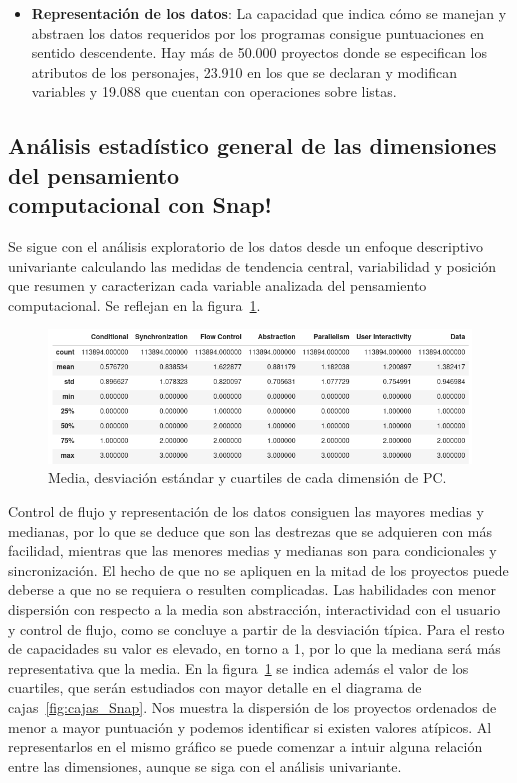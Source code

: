 \documentclass[a4paper, 12pt]{book}
\begin{document}
\begin{itemize}
    \item \textbf{Representación de los datos}: La capacidad que indica cómo se manejan y abstraen los datos requeridos por los programas consigue puntuaciones en sentido descendente. Hay más de 50.000 proyectos donde se especifican los atributos de los personajes, 23.910 en los que se declaran y modifican variables y 19.088 que cuentan con operaciones sobre listas. 
\end{itemize}    

\subsection{Análisis estadístico general de las dimensiones del pensamiento \\computacional con Snap!}
\label{subsec:estad_pc_Snap}

Se sigue con el análisis exploratorio de los datos desde un enfoque descriptivo univariante calculando las medidas de tendencia central, variabilidad y posición que resumen y caracterizan cada variable analizada del pensamiento computacional. Se reflejan en la figura~\ref{fig:describe_Snap}.

\begin{figure}[H]
    \centering
    \includegraphics[width=1\textwidth]{img/describe_Snap.png}
    \caption{Media, desviación estándar y cuartiles de cada dimensión de PC.}
    \label{fig:describe_Snap}
\end{figure}

Control de flujo y representación de los datos consiguen las mayores medias y medianas, por lo que se deduce que son las destrezas que se adquieren con más facilidad, mientras que las menores medias y medianas son para condicionales y sincronización. El hecho de que no se apliquen en la mitad de los proyectos puede deberse a que no se requiera o resulten complicadas. Las habilidades con menor dispersión con respecto a la media son abstracción, interactividad con el usuario y control de flujo, como se concluye a partir de la desviación típica. Para el resto de capacidades su valor es elevado, en torno a 1,
por lo que la mediana será más representativa que la media. En la figura~\ref{fig:describe_Snap} se indica además el valor de los cuartiles, que serán estudiados con mayor detalle en el diagrama de cajas~\ref{fig:cajas_Snap}.
Nos muestra la dispersión de los proyectos ordenados de menor a mayor puntuación y podemos identificar si existen valores atípicos. Al representarlos en el mismo gráfico se puede comenzar a intuir alguna relación entre las dimensiones, aunque se siga con el análisis univariante.
\end{document}
